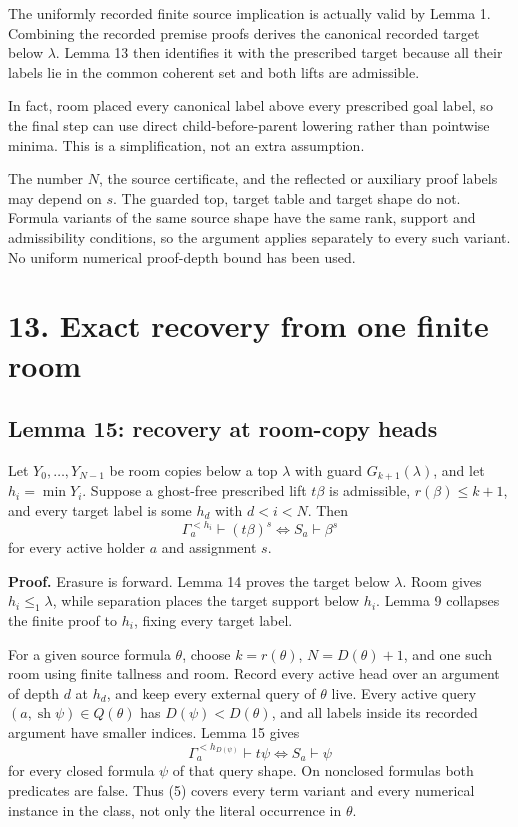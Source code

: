 \documentclass[
  11pt,
  letterpaper,
]{article}
\begin{document}
The uniformly recorded finite source implication is actually valid by
Lemma 1. Combining the recorded premise proofs derives the canonical
recorded target below \(\lambda\). Lemma 13 then identifies it with the
prescribed target because all their labels lie in the common coherent
set and both lifts are admissible.

In fact, room placed every canonical label above every prescribed goal
label, so the final step can use direct child-before-parent lowering
rather than pointwise minima. This is a simplification, not an extra
assumption.

The number \(N\), the source certificate, and the reflected or auxiliary
proof labels may depend on \(s\). The guarded top, target table and
target shape do not. Formula variants of the same source shape have the
same rank, support and admissibility conditions, so the argument applies
separately to every such variant. No uniform numerical proof-depth bound
has been used.

\section{13. Exact recovery from one finite
room}\label{exact-recovery-from-one-finite-room}

\subsection{Lemma 15: recovery at room-copy
heads}\label{lemma-15-recovery-at-room-copy-heads}

Let \(Y_0,\ldots,Y_{N-1}\) be room copies below a top \(\lambda\) with
guard \(G_{k+1}(\lambda)\), and let \(h_i=\min Y_i\). Suppose a
ghost-free prescribed lift \(t\beta\) is admissible,
\(r(\beta)\leq k+1\), and every target label is some \(h_d\) with
\(d<i<N\). Then \[
\Gamma_a^{<h_i}\vdash(t\beta)^s
\iff S_a\vdash\beta^s
\] for every active holder \(a\) and assignment \(s\).

\textbf{Proof.} Erasure is forward. Lemma 14 proves the target below
\(\lambda\). Room gives \(h_i\leq_1\lambda\), while separation places
the target support below \(h_i\). Lemma 9 collapses the finite proof to
\(h_i\), fixing every target label.

For a given source formula \(\theta\), choose \(k=r(\theta)\),
\(N=D(\theta)+1\), and one such room using finite tallness and room.
Record every active head over an argument of depth \(d\) at \(h_d\), and
keep every external query of \(\theta\) live. Every active query
\((a,\operatorname{sh}\psi)\in Q(\theta)\) has \(D(\psi)<D(\theta)\),
and all labels inside its recorded argument have smaller indices. Lemma
15 gives \[
\Gamma_a^{<h_{D(\psi)}}\vdash t\psi
\iff S_a\vdash\psi
\tag{5}
\] for every closed formula \(\psi\) of that query shape. On nonclosed
formulas both predicates are false. Thus (5) covers every term variant
and every numerical instance in the class, not only the literal
occurrence in \(\theta\).
\end{document}
